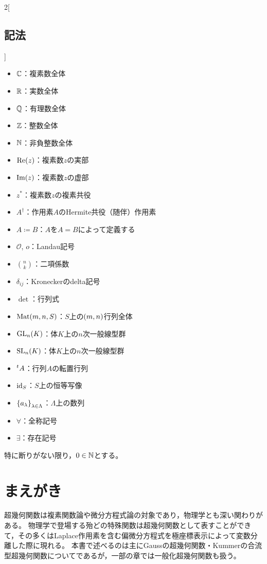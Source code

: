 \documentclass[a4paper,draft]{ltjsarticle}
\begin{document}
\columnseprule=0.5pt
\begin{multicols}{2}[\subsection*{記法}]
    \begin{itemize}
        \item $\mathbb{C}$：複素数全体
        \item $\mathbb{R}$：実数全体
        \item $\mathbb{Q}$：有理数全体
        \item $\mathbb{Z}$：整数全体
        \item $\mathbb{N}$：非負整数全体
        \item $\re{z}$：複素数$z$の実部
        \item $\im{z}$：複素数$z$の虚部
        \item $z^*$：複素数$z$の複素共役
        \item $A^\dagger$：作用素$A$のHermite共役（随伴）作用素
        \item $A\coloneqq B$：$A$を$A=B$によって定義する
        \item $\mathcal{O}$, $o$：Landau記号
        \item $\binom{n}{k}$：二項係数
        \item $\delta_{ij}$：Kroneckerのdelta記号
        \item $\det$：行列式
        \item $\Mat{m}{n}{S}$：$S$上の$\pare{m,n}$行列全体
        \item $\GL{n}{K}$：体$K$上の$n$次一般線型群
        \item $\SL{n}{K}$：体$K$上の$n$次一般線型群
        \item ${}^t{A}$：行列$A$の転置行列
        \item $\mathrm{id}_{S}$：$S$上の恒等写像
        \item $\seq{a_\lambda}{\lambda\in \Lambda}$：$\Lambda$上の数列
        \item $\forall$：全称記号
        \item $\exists$：存在記号
    \end{itemize}
\end{multicols}
\columnseprule=0.0pt


特に断りがない限り，$0\in\mathbb{N}$とする。

\section{まえがき}\label{sec:まえがき}
超幾何関数は複素関数論や微分方程式論の対象であり，物理学とも深い関わりがある。
物理学で登場する殆どの特殊関数は超幾何関数として表すことができて，その多くはLaplace作用素を含む偏微分方程式を極座標表示によって変数分離した際に現れる。
本書で述べるのは主にGaussの超幾何関数・Kummerの合流型超幾何関数についてであるが，一部の章では一般化超幾何関数も扱う。
\end{document}
